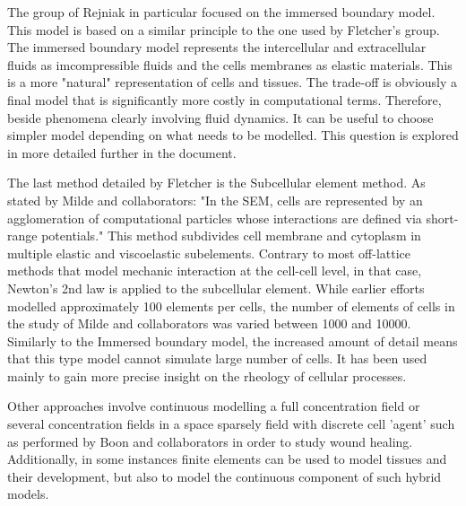 \documentclass[11pt,a4paper]{article}
\begin{document}
The group of Rejniak in particular focused on the immersed boundary model.\cite{Rejniak2007}\cite{Rejniak2012} This model is based on a similar principle to the one used by Fletcher's group. The immersed boundary model represents the intercellular and extracellular fluids as imcompressible fluids and the cells membranes as elastic materials. This is a more "natural" representation of cells and tissues. The trade-off is obviously a final model that is significantly more costly in computational terms. Therefore, beside phenomena clearly involving fluid dynamics. It can be useful to choose simpler model depending on what needs to be modelled. This question is explored in more detailed further in the document.

The last method detailed by Fletcher is the Subcellular element method. As stated by Milde and collaborators: "In the SEM, cells are represented by an agglomeration of computational particles whose interactions are defined via short-range potentials."\cite{Milde2014} This method subdivides cell membrane and cytoplasm in multiple elastic and viscoelastic subelements. Contrary to most off-lattice methods that model mechanic interaction at the cell-cell level, in that case, Newton's 2nd law is applied to the subcellular element. While earlier efforts modelled approximately 100 elements per cells,\cite{Newman2005} the number of elements of cells in the study of Milde and collaborators was varied between 1000 and 10000. Similarly to the Immersed boundary model, the increased amount of detail means that this type model cannot simulate large number of cells. It has been used mainly to gain more precise insight on the rheology of cellular processes.

Other approaches involve continuous  modelling a full concentration field or several concentration fields in a space sparsely field with discrete cell 'agent' such as performed by Boon and collaborators in order to study wound healing.\cite{Boon2015} Additionally, in some instances finite elements can be used to model tissues and their development,\cite{Oliveira2022} but also to model the continuous component of such hybrid models.
\end{document}
